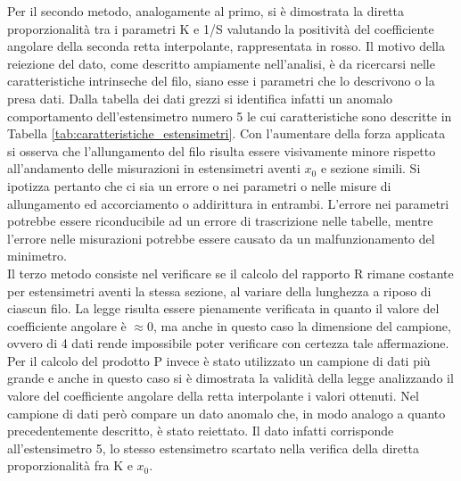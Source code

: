\documentclass[a4paper,11pt,oneside]{article}
\begin{document}
Per il secondo metodo, analogamente al primo, si è dimostrata la diretta proporzionalità tra i parametri K e 1/S  valutando la positività del coefficiente angolare della seconda retta interpolante, rappresentata in rosso. Il motivo della reiezione del dato, come descritto ampiamente nell'analisi, è da ricercarsi nelle caratteristiche intrinseche del filo, siano esse i parametri che lo descrivono o la presa dati.
Dalla tabella dei dati grezzi si identifica infatti un anomalo comportamento dell'estensimetro numero 5 le cui caratteristiche sono descritte in Tabella \ref{tab:caratteristiche_estensimetri}. Con l'aumentare della forza applicata si osserva che l'allungamento del filo risulta essere visivamente minore rispetto all'andamento delle misurazioni in estensimetri aventi $x_{0}$ e sezione simili. 
Si ipotizza pertanto che ci sia un errore o nei parametri o nelle misure di allungamento ed accorciamento o addirittura in entrambi. L'errore nei parametri potrebbe essere riconducibile ad un errore di trascrizione nelle tabelle, mentre l'errore nelle misurazioni potrebbe essere causato da un malfunzionamento del minimetro.\\


Il terzo metodo consiste nel verificare se il calcolo del rapporto R rimane costante per estensimetri aventi la stessa sezione, al variare della lunghezza a riposo di ciascun filo. La legge risulta essere pienamente verificata in quanto il valore del coefficiente angolare è $\approx 0$, ma anche in questo caso la dimensione del campione, ovvero di 4 dati rende impossibile poter verificare con certezza tale affermazione.\\


Per il calcolo del prodotto P invece è stato utilizzato un campione di dati più grande e anche in questo caso si è dimostrata la validità della legge analizzando il valore del coefficiente angolare della retta interpolante i valori ottenuti. Nel campione di dati però compare un dato anomalo che, in modo analogo a quanto precedentemente descritto, è stato reiettato. Il dato infatti corrisponde all'estensimetro 5, lo stesso estensimetro scartato nella verifica della diretta proporzionalità fra K e $x_{0}$.\\
\end{document}
